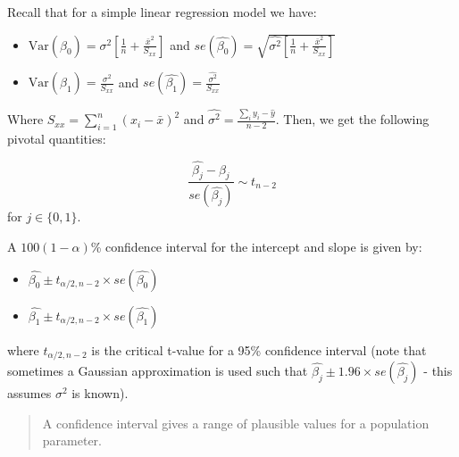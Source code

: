 \documentclass[
  letterpaper,
  DIV=11,
  numbers=noendperiod]{scrartcl}
\begin{document}
\begin{tcolorbox}[enhanced jigsaw, colback=white, toptitle=1mm, bottomrule=.15mm, colbacktitle=quarto-callout-note-color!10!white, breakable, title=\textcolor{quarto-callout-note-color}{\faInfo}\hspace{0.5em}{Re-cap on SLR}, colframe=quarto-callout-note-color-frame, opacitybacktitle=0.6, toprule=.15mm, arc=.35mm, coltitle=black, leftrule=.75mm, bottomtitle=1mm, titlerule=0mm, opacityback=0, rightrule=.15mm, left=2mm]

Recall that for a simple linear regression model we have:

\begin{itemize}
\item
  \(\text{Var}(\hat{\beta}_0) = \sigma^2 \left[\frac{1}{n} + \frac{\bar{x}^2}{S_{xx}}\right]\)
  and
  \(se(\hat{\beta_0}) = \sqrt{\hat{\sigma^2} \left[\frac{1}{n} + \frac{\bar{x}^2}{S_{xx}}\right]}\)
\item
  \(\text{Var}(\hat{\beta}_1) = \frac{\sigma^2}{S_{xx}}\) and
  \(se(\hat{\beta_1}) = \frac{\hat{\sigma^2}}{S_{xx}}\)
\end{itemize}

Where \(S_{xx} = \sum_{i=1}^n (x_i-\bar{x})^2\) and
\(\hat{\sigma^2} = \frac{\sum_i y_i-\hat{y}}{n-2}\). Then, we get the
following pivotal quantities:

\[
\dfrac{\hat{\beta_j} - \beta_j}{se(\hat{\beta_j})} \sim t_{n-2}
\]for \(j \in \{0,1\}\).

\end{tcolorbox}

A \(100(1-\alpha)\)\% confidence interval for the intercept and slope is
given by:

\begin{itemize}
\item
  \(\hat{\beta_0} \pm t_{\alpha/2,n-2} \times se(\hat{\beta_0})\)
\item
  \(\hat{\beta_1} \pm t_{\alpha/2,n-2} \times se(\hat{\beta_1})\)
\end{itemize}

where \(t_{\alpha/2,n-2}\) is the critical t-value for a 95\% confidence
interval (note that sometimes a Gaussian approximation is used such that
\(\hat{\beta_j} \pm 1.96 \times se(\hat{\beta_j})\) - this assumes
\(\sigma^2\) is known).

\begin{quote}
A confidence interval gives a range of plausible values for a population
parameter.
\end{quote}
\end{document}

